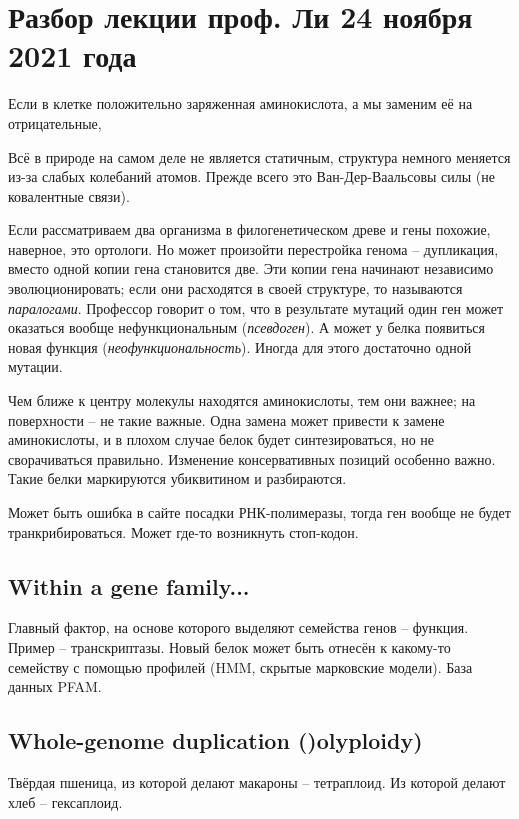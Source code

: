 \documentclass[main.tex]{subfiles}
\begin{document}
\section{ Разбор лекции проф. Ли 24 ноября 2021 года }

Если в клетке положительно заряженная аминокислота, а мы заменим её на отрицательные,

Всё в природе на самом деле не является статичным, структура немного меняется из-за слабых колебаний атомов.
Прежде всего это Ван-Дер-Ваальсовы силы (не ковалентные связи).

Если рассматриваем два организма в филогенетическом древе и гены похожие, наверное, это ортологи.
Но может произойти перестройка генома -- дупликация, вместо одной копии гена становится две.
Эти копии гена начинают независимо эволюционировать; если они расходятся в своей структуре, то называются \emph{паралогами}.
Профессор говорит о том, что в результате мутаций один ген может оказаться вообще нефункциональным (\emph{псевдоген}).
А может у белка появиться новая функция (\emph{неофункциональность}).
Иногда для этого достаточно одной мутации.
\begin{leftbar}
Чем ближе к центру молекулы находятся аминокислоты, тем они важнее; на поверхности -- не такие важные.
Одна замена может привести к замене аминокислоты, и в плохом случае белок будет синтезироваться, но не сворачиваться правильно.
Изменение консервативных позиций особенно важно.
Такие белки маркируются убиквитином и разбираются.

Может быть ошибка в сайте посадки РНК-полимеразы, тогда ген вообще не будет транкрибироваться.
Может где-то возникнуть стоп-кодон.
\end{leftbar}

\subsection{Within a gene family...}

Главный фактор, на основе которого выделяют семейства генов -- функция.
Пример -- транскриптазы.
Новый белок может быть отнесён к какому-то семейству с помощью профилей (HMM, скрытые марковские модели).
База данных PFAM.

\subsection{Whole-genome duplication ()olyploidy)}

Твёрдая пшеница, из которой делают макароны -- тетраплоид.
Из которой делают хлеб -- гексаплоид.
\end{document}
